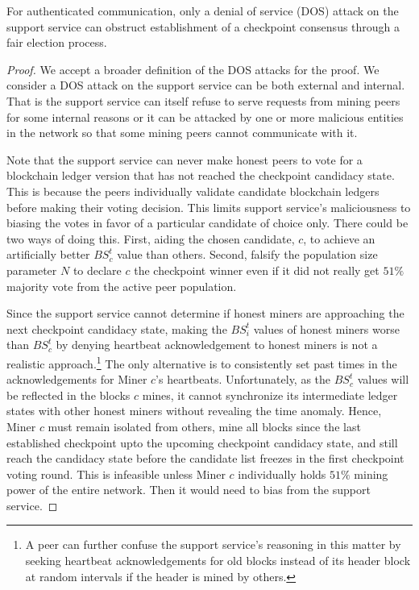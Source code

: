 \begin{lemma}
\label{l-support-attack}
For authenticated communication, only a denial of service (DOS) attack  on the support service can obstruct establishment of a checkpoint consensus through a fair election process.    
\end{lemma}
\begin{proof}
We accept a broader definition of the DOS attacks for the proof. We consider a DOS attack on the support service can be both external and internal. That is the support service can itself refuse to serve requests from mining peers for some internal reasons or it can be attacked by one or more malicious entities in the network so that some mining peers cannot communicate with it. 

Note that the support service can never make honest peers to vote for a blockchain ledger version that has not reached the checkpoint candidacy state. This is because the peers individually validate candidate blockchain ledgers before making their voting decision. This limits support service's maliciousness to biasing the votes in favor of a particular candidate of choice only. There could be two ways of doing this. First, aiding the chosen candidate, $c$, to achieve an artificially better $BS_c^t$ value than others. Second, falsify the population size parameter $N$ to declare $c$ the checkpoint winner even if it did not really get $51\%$ majority vote from the active peer population.  

Since the support service cannot determine if honest miners are approaching the next checkpoint candidacy state, making the $BS_i^t$ values of honest miners worse than $BS_c^t$ by denying heartbeat acknowledgement to honest miners is not a realistic approach.\footnote{A peer can further confuse the support service's reasoning in this matter by seeking heartbeat acknowledgements for old blocks instead of its header block at random intervals if the header is mined by others.} The only alternative is to consistently set past times in the acknowledgements for Miner $c$'s heartbeats. Unfortunately, as the $BS_c^t$ values will be reflected in the blocks $c$ mines, it cannot synchronize its intermediate ledger states with other honest miners without revealing the time anomaly. Hence, Miner $c$ must remain isolated from others, mine all blocks since the last established checkpoint upto the upcoming checkpoint candidacy state, and still reach the candidacy state before the candidate list freezes in the first checkpoint voting round. This is infeasible unless Miner $c$ individually holds $51\%$ mining power of the entire network. Then it would need to bias from the support service.      


\end{proof}
